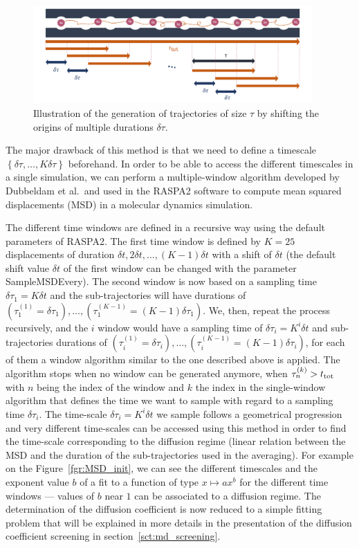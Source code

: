 \documentclass[main]{subfiles}
\begin{document}
\begin{figure}[ht]
  \centering
    \includegraphics[width=0.95\textwidth]{figures/5-diffusion/diffusion_averaging.pdf}
    \caption{Illustration of the generation of trajectories of size $\tau$ by shifting the origins of multiple durations $\delta\tau$. }\label{fgr:window_msd}
\end{figure}

The major drawback of this method is that we need to define a timescale $\left\{\delta\tau, \ldots, K\delta\tau\right\}$ beforehand. In order to be able to access the different timescales in a single simulation, we can perform a multiple-window algorithm developed by Dubbeldam et al.\ and used in the RASPA2 software to compute mean squared displacements (MSD) in a molecular dynamics simulation.

The different time windows are defined in a recursive way using the default parameters of RASPA2. The first time window is defined by $K=25$ displacements of duration $\delta t, 2\delta t, \ldots,(K-1)\delta t$ with a shift of $\delta t$ (the default shift value $\delta t$ of the first window can be changed with the parameter SampleMSDEvery). The second window is now based on a sampling time $\delta \tau_1 = K\delta t$ and the sub-trajectories will have durations of $\left(\tau_1^{(1)} = \delta\tau_1\right),\ldots,\left(\tau_1^{(K-1)} = (K-1)\delta\tau_1\right)$. We, then, repeat the process recursively, and the $i$ window would have a sampling time of $\delta \tau_i = K^i\delta t$ and sub-trajectories durations of $\left(\tau_i^{(1)} = \delta\tau_i\right),\ldots,\left(\tau_i^{(K-1)} = (K-1)\delta\tau_i\right)$, for each of them a window algorithm similar to the one described above is applied. The algorithm stops when no window can be generated anymore, when $\tau_n^{(k)}>t_{\text{tot}}$ with $n$ being the index of the window and $k$ the index in the single-window algorithm that defines the time we want to sample with regard to a sampling time $\delta\tau_i$. The time-scale $\delta \tau_i = K^i\delta t$ we sample follows a geometrical progression and very different time-scales can be accessed using this method in order to find the time-scale corresponding to the diffusion regime (linear relation between the MSD and the duration of the sub-trajectories used in the averaging). For example on the Figure~\ref{fgr:MSD_init}, we can see the different timescales and the exponent value $b$ of a fit to a function of type $x \mapsto ax^b$ for the different time windows --- values of $b$ near $1$ can be associated to a diffusion regime. The determination of the diffusion coefficient is now reduced to a simple fitting problem that will be explained in more details in the presentation of the diffusion coefficient screening in section~\ref{sct:md_screening}.
\end{document}
